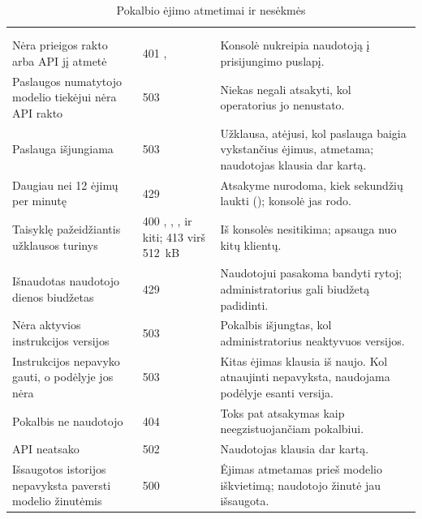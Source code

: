 \begin{xltabular}{\textwidth}{@{}L{42mm}L{43mm}Y@{}}
\caption{Pokalbio ėjimo atmetimai ir nesėkmės}\label{tab:chat:failures}\\
\toprule
{} &  &  \\
\midrule
\endfirsthead
\toprule
{} &  &  \\
\midrule
\endhead
\bottomrule
\endlastfoot
{} \\
Nėra prieigos rakto arba API jį atmetė & 401 ,  & Konsolė nukreipia naudotoją į prisijungimo puslapį. \\
Paslaugos numatytojo modelio tiekėjui nėra API rakto & 503  & Niekas negali atsakyti, kol operatorius jo nenustato. \\
Paslauga išjungiama & 503  & Užklausa, atėjusi, kol paslauga baigia vykstančius ėjimus, atmetama; naudotojas klausia dar kartą. \\
Daugiau nei 12 ėjimų per minutę & 429  & Atsakyme nurodoma, kiek sekundžių laukti (); konsolė jas rodo. \\
Taisyklę pažeidžiantis užklausos turinys & 400 , , ,  ir kiti; 413  virš 512~kB & Iš konsolės nesitikima; apsauga nuo kitų klientų. \\
Išnaudotas naudotojo dienos biudžetas & 429  & Naudotojui pasakoma bandyti rytoj; administratorius gali biudžetą padidinti. \\
Nėra aktyvios instrukcijos versijos & 503  & Pokalbis išjungtas, kol administratorius neaktyvuos versijos. \\
Instrukcijos nepavyko gauti, o podėlyje jos nėra & 503  & Kitas ėjimas klausia iš naujo. Kol atnaujinti nepavyksta, naudojama podėlyje esanti versija. \\
Pokalbis ne naudotojo & 404  & Toks pat atsakymas kaip neegzistuojančiam pokalbiui. \\
API neatsako & 502  & Naudotojas klausia dar kartą. \\
Išsaugotos istorijos nepavyksta paversti modelio žinutėmis & 500  & Ėjimas atmetamas prieš modelio iškvietimą; naudotojo žinutė jau išsaugota. \\

\end{xltabular}

